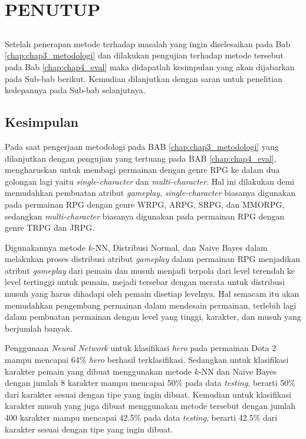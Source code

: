 \chapter{PENUTUP}
\label{sec:chap5_tutup}
\vspace{1ex}

\section*{}
Setelah penerapan metode terhadap masalah yang ingin diselesaikan pada Bab \ref{chap:chap3_metodologi} dan dilakukan pengujian terhadap metode tersebut pada Bab \ref*{chap:chap4_eval} maka didapatlah kesimpulan yang akan dijabarkan pada Sub-bab berikut. Kemudian dilanjutkan dengan saran untuk penelitian kedepannya pada Sub-bab selanjutnya.
\vspace{1ex}

\section{Kesimpulan}
\label{sec:sec4_kesimpulan}
\vspace{1ex}

Pada saat pengerjaan metodologi pada BAB \ref{chap:chap3_metodologi} yang dilanjutkan dengan pengujian yang tertuang pada BAB \ref{chap:chap4_eval}, mengharuskan untuk membagi permainan dengan genre RPG ke dalam dua golongan lagi yaitu \textit{single-character} dan \textit{multi-character}. Hal ini dilakukan demi memudahkan pembuatan atribut \textit{gameplay}, \textit{single-character} biasanya digunakan pada permainan RPG dengan genre WRPG, ARPG, SRPG, dan MMORPG, sedangkan \textit{multi-character} biasanya digunakan pada permainan RPG dengan genre TRPG dan JRPG.
\vspace{1ex}

Digunakannya metode $k$-NN, Distribusi Normal, dan Naive Bayes dalam melakukan proses distribusi atribut \textit{gameplay} dalam permainan RPG menjadikan atribut \textit{gameplay} dari pemain dan musuh menjadi terpola dari level terendah ke level tertinggi untuk pemain, mejadi tersebar dengan merata untuk distribusi musuh yang harus dihadapi oleh pemain disetiap levelnya. Hal semacam itu akan memudahkan pengembang permainan dalam mendesain permainan, terlebih lagi dalam pembuatan permainan dengan level yang tinggi, karakter, dan musuh yang berjumlah banyak.
\vspace{1ex}

Penggunaan \textit{Neural Network} untuk klasifikasi \textit{hero} pada permainan Dota 2 mampu mencapai 64\% \textit{hero} berhasil terklasifikasi. Sedangkan untuk klasifikasi karakter pemain yang dibuat menggunakan metode $k$-NN dan Naive Bayes dengan jumlah 8 karakter mampu mencapai 50\% pada data \textit{testing}, berarti 50\% dari karakter sesuai dengan tipe yang ingin dibuat. Kemudian untuk klasifikasi karakter musuh yang juga dibuat menggunakan metode tersebut dengan jumlah 400 karakter mampu mencapai 42.5\% pada data \textit{testing}, berarti 42.5\% dari karakter sesuai dengan tipe yang ingin dibuat.
\vspace{1ex}

